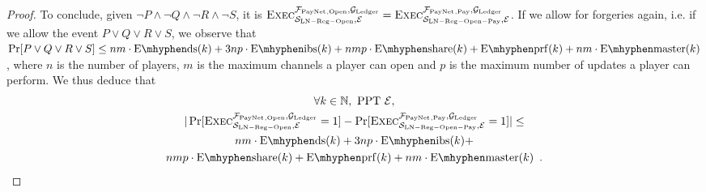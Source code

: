 \begin{proof}
  To conclude, given $\neg P \wedge \neg Q \wedge \neg R \wedge \neg S$, it is
  $\textsc{Exec}^{\mathcal{F}_{\mathrm{PayNet}}{}_{\mathrm{, Open}}, \mathcal{G}_{\mathrm{Ledger}}}_{\mathcal{S}_{\mathrm{LN
  - Reg - Open}}, \mathcal{E}} = \textsc{Exec}^{\mathcal{F}_{\mathrm{PayNet}}{}_{\mathrm{, Pay}},
  \mathcal{G}_{\mathrm{Ledger}}}_{\mathcal{S}_{\mathrm{LN - Reg - Open - Pay}}, \mathcal{E}}$. If we
  allow for forgeries again, i.e. if we allow the event $P \vee Q \vee R \vee
  S$, we observe that $\Pr[P \vee Q \vee R \vee S] \leq nm \cdot \mathrm{E
  \mhyphen ds}(k) + 3np \cdot \mathrm{E \mhyphen ibs}(k) + nmp \cdot \mathrm{E
  \mhyphen share}(k) + \mathrm{E \mhyphen prf}(k) + nm \cdot \mathrm{E \mhyphen
  master}(k)$, where $n$ is the number of players, $m$ is the maximum channels a
  player can open and $p$ is the maximum number of updates a player can perform.
  We thus deduce that
  \begin{gather*}
    \forall k \in \mathbb{N}, \text{ PPT } \environment, \\
    |\Pr[\textsc{Exec}^{\fpaynet{}_{\mathrm{, Open}},
    \ledger}_{\simulator_{\mathrm{LN - Reg - Open}}, \environment} = 1] -
    \Pr[\textsc{Exec}^{\fpaynet{}_{\mathrm{, Pay}},
    \ledger}_{\simulator_{\mathrm{LN - Reg - Open - Pay}}, \environment} = 1]|
    \leq \\
    nm \cdot \mathrm{E \mhyphen ds}(k) + 3np \cdot \mathrm{E \mhyphen ibs}(k) +
    \\
    nmp \cdot \mathrm{E \mhyphen share}(k) + \mathrm{E \mhyphen prf}(k) + nm
    \cdot \mathrm{E \mhyphen master}(k) \enspace.
  \end{gather*}
\end{proof}
